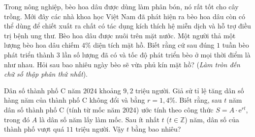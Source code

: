 \begin{bt}%
	 		Trong nông nghiệp, bèo hoa dâu được dùng làm phân bón, nó rất tốt cho cây trồng. Mới đây các nhà khoa học Việt Nam đã phát hiện ra bèo hoa dâu còn có thể dùng để chiết xuất ra chất có tác dụng kích thích hệ miễn dịch và hỗ trợ điều trị bệnh ung thư. Bèo hoa dâu được nuôi trên mặt nước. Một người thả một lượng bèo hoa dâu chiếm $4\%$ diện tích mặt hồ. Biết rằng cứ sau đúng $1$ tuần bèo phát triển thành $3$ lần số lượng đã có và tốc độ phát triển bèo ở mọi thời điểm là như nhau. Hỏi sau bao nhiêu ngày bèo sẽ vừa phủ kín mặt hồ? (\textit{Làm tròn đến chữ số thập phân thứ nhất}).
	 	\end{bt}

\begin{bt}%
	Dân số thành phố C năm $2024$ khoảng $9{,}2$ triệu người. Giả sử tỉ lệ tăng dân số hàng năm của thành phố C không đổi và bằng $r=1{,}4\%$. Biết rằng, sau $t$ năm dân số thành phố C (tính từ mốc năm $2024$) ước tính theo công thức $S=A\cdot \mathrm{e}^{rt}$, trong đó $A$ là dân số năm lấy làm mốc. Sau ít nhất $t$ ($t\in \mathbb{Z}$) năm, dân số của thành phố vượt quá $11$ triệu người. Vậy $t$ bằng bao nhiêu?
\end{bt}

